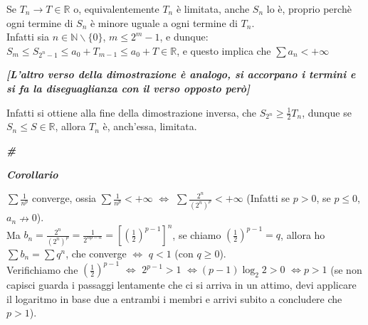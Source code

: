 \documentclass{article}
\theoremstyle{definition}
\newcommand{\R}{\mathbb{R}}
\newcommand{\N}{\mathbb{N}}
\newcommand{\cvd}{\begin{center} \textbf{\textit{\#}} \end{center}}
\begin{document}
Se $T_n \to T \in \R$ o, equivalentemente $T_n$ è limitata, anche $S_n$ lo è, proprio perchè ogni termine di $S_n$ è minore uguale a ogni termine di $T_n$.
\\
Infatti sia $n \in \N \backslash \{0\}$, $m \leqslant 2^m - 1$, e dunque:
\\
$S_m \leqslant S_{2^n-1}\leqslant a_0+ T_{m-1} \leqslant a_0 + T \in \R$, e questo implica che $\sum a_n < +\infty$
\begin{center}
    \textbf{\textit{[L'altro verso della dimostrazione è analogo, si accorpano i termini e si fa la diseguaglianza con il verso opposto però]}}
\end{center}
Infatti si ottiene alla fine della dimostrazione inversa, che $S_{2^n} \geqslant \frac{1}{2}T_n$, dunque se $S_n \leqslant S \in \R$, allora $T_n$ è, anch'essa, limitata.
\\
\cvd
\begin{center}
    \textbf{\textit{Corollario}}
\end{center}
$\sum \frac{1}{n^p}$ converge, ossia $\sum \frac{1}{n^p} < +\infty \,\, \Longleftrightarrow \,\,  \sum \frac{2^n}{(2^n)^p} < +\infty$ (Infatti se $p >0$, se $p \leqslant 0$, $a_n \nrightarrow 0$).
\\
Ma $b_n=\frac{2^n}{(2^n)^p}=\frac{1}{2^{np-n}}=\left[(\frac{1}{2})^{p-1}\right]^n$, se chiamo $\left(\frac{1}{2}\right)^{p-1}=q$, allora ho $\sum b_n = \sum q^n$, che converge $\Longleftrightarrow \,\, q < 1$ (con $q \geqslant 0$).
\\
Verifichiamo che $\left(\frac{1}{2}\right)^{p-1} \,\, \Longleftrightarrow \,\, 2^{p-1} > 1 \,\, \Longleftrightarrow (p-1)\log_2{2} > 0 \,\, \Longleftrightarrow p >1$ (se non capisci guarda i passaggi lentamente che ci si arriva in un attimo, devi applicare il logaritmo in base due a entrambi i membri e arrivi subito a concludere che $p > 1$).
\end{document}
